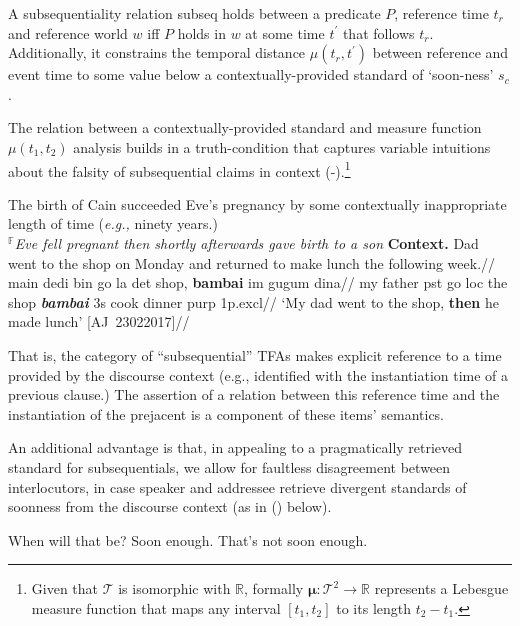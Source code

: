 	A subsequentiality relation {\sc subseq} holds between a predicate $P$, reference time $t_r$ and reference world $w$ iff $P$ holds in $w$ at some time $t^\prime$ that follows $t_r$.\\Additionally, it constrains the temporal distance $\mu(t_r,t^\prime)$ between reference and event time to some value below a contextually-provided standard of `soon-ness' $s_c$.\xe
	

The relation between a contextually-provided standard and measure function $\mu(t_1,t_2)$ analysis builds in a truth-condition that captures variable intuitions about the falsity of subsequential claims in context (\nextx-\anextx).\footnote{Given that $\mathcal T$ is isomorphic with $ \mathbb R $, formally $\boldsymbol\mu:\mathcal T^2\to \mathbb  R$ represents a Lebesgue measure function that maps any interval $ [t_1,t_2] $ to its length $t_2-t_1$.}

\pex\a The birth of Cain succeeded Eve's pregnancy by some contextually inappropriate length of time (\textit{e.g.,} ninety years.)\\
$ ^{\mathbb F} $\textit{Eve fell pregnant then shortly afterwards gave birth to a son}
\a\begingl\glpreamble\textbf{Context.} Dad went to the shop on Monday and returned to make lunch the following week.//
\gla {}main dedi bin go la det shop, \textbf{bambai} im gugum dina//
\glb my father {\sc pst} go {\sc loc} the shop \textit{\textbf{bambai}} 3s cook dinner {\sc purp} 1p{\sc.excl}//
\glft`My dad went to the shop, \textbf{then} he made lunch' \hspace*{\fill}[AJ~23022017]//
\endgl\xe


\noindent That is, the category of ``subsequential'' TFAs makes explicit reference to a time provided by the discourse context (e.g., identified with the instantiation time of a previous clause.) The assertion of a relation between this reference time and the instantiation of the prejacent is a component of these items' semantics.

 An additional advantage is that, in appealing to a pragmatically retrieved standard for subsequentials, we allow for faultless disagreement between interlocutors, in case speaker and addressee retrieve divergent standards of soonness from the discourse context (as in () below).

\pex[labelwidth=3.5em]
\a[label=\textbf{Fry}] When will that be?
\a[label=\textbf{Glurmo}] Soon enough.
\a[label=\textbf{Fry}] That's not soon enough.
\xe

